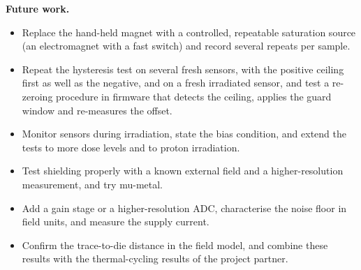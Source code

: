 \documentclass[12pt,a4paper]{article}
\begin{document}
\textbf{Future work.}
\begin{itemize}
\item Replace the hand-held magnet with a controlled, repeatable saturation source (an electromagnet with a fast switch) and record several repeats per sample.
\item Repeat the hysteresis test on several fresh sensors, with the positive ceiling first as well as the negative, and on a fresh irradiated sensor, and test a re-zeroing procedure in firmware that detects the ceiling, applies the guard window and re-measures the offset.
\item Monitor sensors during irradiation, state the bias condition, and extend the tests to more dose levels and to proton irradiation.
\item Test shielding properly with a known external field and a higher-resolution measurement, and try mu-metal.
\item Add a gain stage or a higher-resolution ADC, characterise the noise floor in field units, and measure the supply current.
\item Confirm the trace-to-die distance in the field model, and combine these results with the thermal-cycling results of the project partner.
\end{itemize}


\end{document}
